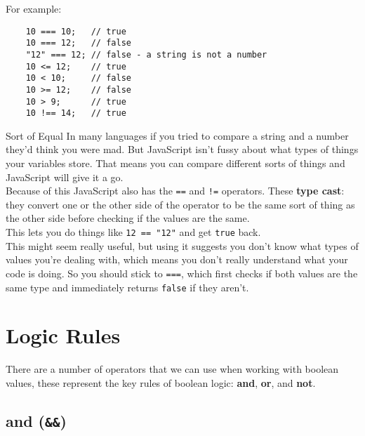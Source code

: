 \par\bigskip

For example:

\begin{verbatim}
    10 === 10;   // true
    10 === 12;   // false
    "12" === 12; // false - a string is not a number
    10 <= 12;    // true
    10 < 10;     // false
    10 >= 12;    // false
    10 > 9;      // true
    10 !== 14;   // true
\end{verbatim}

\pagebreak

\begin{infobox}{Sort of Equal}
    In many languages if you tried to compare a string and a number they'd think you were mad. But JavaScript isn't fussy about what types of things your variables store. That means you can compare different sorts of things and JavaScript will give it a go.
    \\

    Because of this JavaScript also has the \texttt{==} and \texttt{!=} operators. These \textbf{type cast}: they convert one or the other side of the operator to be the same sort of thing as the other side before checking if the values are the same.
    \\

    This lets you do things like \texttt{12 == "12"} and get \texttt{true} back.
    \\

    This might seem really useful, but using it suggests you don't know what types of values you're dealing with, which means you don't really understand what your code is doing. So you should stick to \texttt{===}, which first checks if both values are the same type and immediately returns \texttt{false} if they aren't.
\end{infobox}


\section{Logic Rules}

There are a number of operators that we can use when working with boolean values, these represent the key rules of boolean logic: \textbf{and}, \textbf{or}, and \textbf{not}.

\subsection{and (\texttt{\&\&})}

